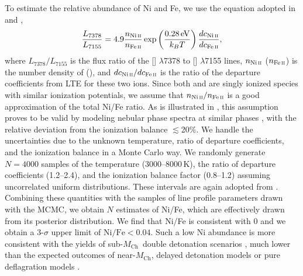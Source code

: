 \documentclass[twocolumn]{aastex631}
\newcommand{\Mch}{$M_\mathrm{Ch}$}
\begin{document}
\begin{CJK*}{UTF8}{gbsn}
To estimate the relative abundance of Ni and Fe, we use the equation adopted in \citet{Jerkstrand_2015} and \citet{Maguire_2018},
\begin{equation}
    \frac{L_{7378}}{L_{7155}} = 4.9\frac{n_{\mathrm{Ni}\,\textsc{ii}}}{n_{\mathrm{Fe}\,\textsc{ii}}}\exp\left(\frac{0.28\,\mathrm
    {eV}}{k_BT}\right)\frac{dc_{\mathrm{Ni}\,\textsc{ii}}}{dc_{\mathrm{Fe}\,\textsc{ii}}},
\end{equation}
where $L_{7378}/L_{7155}$ is the flux ratio of the [] $\lambda$7378 to [] $\lambda$7155 lines, $n_{\mathrm{Ni}\,\textsc{ii}}$ ($n_{\mathrm{Fe}\,\textsc{ii}}$) is the number density of  (), and ${dc_{\mathrm{Ni}\,\textsc{ii}}}/{dc_{\mathrm{Fe}\,\textsc{ii}}}$ is the ratio of the departure coefficients from LTE for these two ions. Since both  and  are singly ionized species with similar ionization potentials, we assume that $n_{\mathrm{Ni}\,\textsc{ii}}/n_{\mathrm{Fe}\,\textsc{ii}}$ is a good approximation of the total Ni/Fe ratio. As is illustrated in \citet{Maguire_2018}, this assumption proves to be valid by modeling nebular phase spectra at similar phases \citep{Fransson_2015,Shingles_2022}, with the relative deviation from the ionization balance $\lesssim$20\%. We handle the uncertainties due to the unknown temperature, ratio of departure coefficients, and the ionization balance in a Monte Carlo way. We randomly generate $N=4000$ samples of the temperature (3000--8000\,K), the ratio of departure coefficients (1.2--2.4), and the ionization balance factor (0.8--1.2) assuming uncorrelated uniform distributions. These intervals are again adopted from \citet{Maguire_2018}. Combining these quantities with the samples of line profile parameters drawn with the MCMC, we obtain $N$ estimates of Ni/Fe, which are effectively drawn from its posterior distribution. We find that Ni/Fe is consistent with 0 and we obtain a 3-$\sigma$ upper limit of $\mathrm{Ni/Fe}<0.04$. Such a low Ni abundance is more consistent with the yields of sub-\Mch\ double detonation scenarios \citep{Shen_DD_2018}, much lower than the expected outcomes of near-\Mch, delayed detonation models \citep{Seitenzahl_2013} or pure deflagration models \citep{Iwamoto_1999}.


\end{CJK*}
\end{document}
